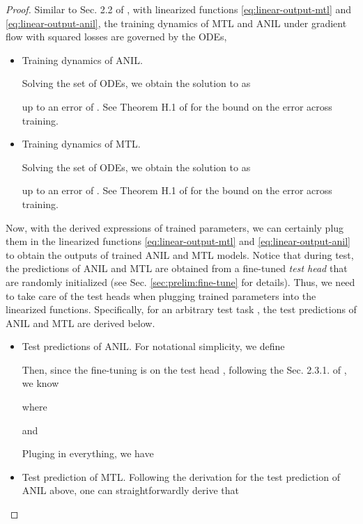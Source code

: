 \documentclass{article}
\begin{document}
\begin{proof}

Similar to Sec. 2.2 of \citet{lee2019wide}, with linearized functions \eqref{eq:linear-output-mtl} and \eqref{eq:linear-output-anil}, the training dynamics of MTL and ANIL under gradient flow with squared losses are governed by the ODEs,
\begin{itemize}
    \item Training dynamics of ANIL.
    
    Solving the set of ODEs, we obtain the solution to  as 
    
    up to an error of . See Theorem H.1 of \citet{lee2019wide} for the bound on the error across training.
     \item Training dynamics of MTL.
    
    Solving the set of ODEs, we obtain the solution to  as
    
    up to an error of . See Theorem H.1 of \citet{lee2019wide} for the bound on the error across training.
    
\end{itemize}

Now, with the derived expressions of trained parameters, we can certainly plug them in the linearized functions \eqref{eq:linear-output-mtl} and \eqref{eq:linear-output-anil} to obtain the outputs of trained ANIL and MTL models. Notice that during test, the predictions of ANIL and MTL are obtained from a fine-tuned \textit{test head} that are randomly initialized (see Sec. \ref{sec:prelim:fine-tune} for details). Thus, we need to take care of the test heads when plugging trained parameters into the linearized functions. Specifically, for an arbitrary test task , the test predictions of ANIL and MTL are derived below.
\begin{itemize}
    \item Test predictions of ANIL.
    For notational simplicity, we define 
    
    Then, since the fine-tuning is on the test head , following the Sec. 2.3.1. of \citet{lee2019wide}, we know
    
    where 
    
    and 
    
    Pluging in everything, we have
    
    \item Test prediction of MTL. Following the derivation for the test prediction of ANIL above, one can straightforwardly derive that 
    
\end{itemize}
\end{proof}
\end{document}
